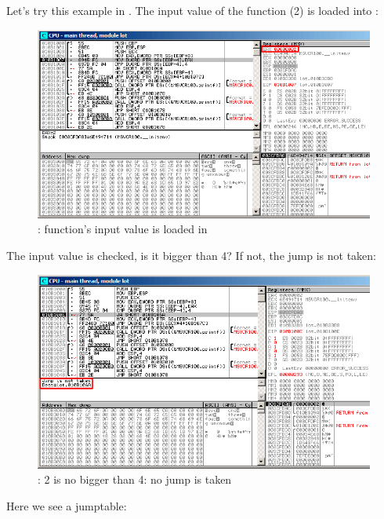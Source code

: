 ﻿\clearpage
\myparagraphold{\olly}
\myindex{\olly}

Let's try this example in \olly.
The input value of the function (2) is loaded into \EAX: 

\begin{figure}[H]
\centering
\includegraphics[scale=\FigScale]{patterns/08_switch/2_lot/olly1.png}
\caption{\olly: function's input value is loaded in \EAX}
\label{fig:switch_lot_olly1}
\end{figure}

\clearpage
The input value is checked, is it bigger than 4? 
If not, the  jump is not taken:
\begin{figure}[H]
\centering
\includegraphics[scale=\FigScale]{patterns/08_switch/2_lot/olly2.png}
\caption{\olly: 2 is no bigger than 4: no jump is taken}
\label{fig:switch_lot_olly2}
\end{figure}

\clearpage
Here we see a jumptable:

